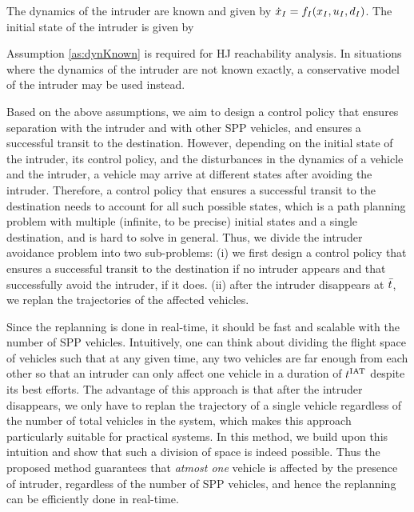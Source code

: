 \begin{assumption}
\label{as:dynKnown}
The dynamics of the intruder are known and given by $\dot{x}_I = f_I(x_I, u_I, d_I)$. The initial state of the intruder is given by 
\end{assumption}

Assumption \ref{as:dynKnown} is required for HJ reachability analysis. In situations where the dynamics of the intruder are not known exactly, a conservative model of the intruder may be used instead.

Based on the above assumptions, we aim to design a control policy that ensures separation with the intruder and with other SPP vehicles, and ensures a successful transit to the destination. However, depending on the initial state of the intruder, its control policy, and the disturbances in the dynamics of a vehicle and the intruder, a vehicle may arrive at different states after avoiding the intruder. Therefore, a control policy that ensures a successful transit to the destination needs to account for all such possible states, which is a path planning problem with multiple (infinite, to be precise) initial states and a single destination, and is hard to solve in general. Thus, we divide the intruder avoidance problem into two sub-problems: (i) we first design a control policy that ensures a successful transit to the destination if no intruder appears and that successfully avoid the intruder, if it does. (ii) after the intruder disappears at $\bar{t}$, we replan the trajectories of the affected vehicles. 

Since the replanning is done in real-time, it should be fast and scalable with the number of SPP vehicles. Intuitively, one can think about dividing the flight space of vehicles such that at any given time, any two vehicles are far enough from each other so that an intruder can only affect one vehicle in a duration of $t^\text{IAT}$ despite its best efforts. The advantage of this approach is that after the intruder disappears, we only have to replan the trajectory of a single vehicle regardless of the number of total vehicles in the system, which makes this approach particularly suitable for practical systems. In this method, we build upon this intuition and show that such a division of space is indeed possible. Thus the proposed method guarantees that \textit{atmost one} vehicle is affected by the presence of intruder, regardless of the number of SPP vehicles, and hence the replanning can be efficiently done in real-time. 

